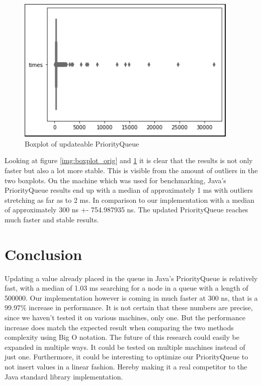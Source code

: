 \documentclass{article}
\begin{document}
\begin{figure}[H]
    \includegraphics[width=300pt]{boxplot_opt}
    \caption{Boxplot of updateable PriorityQueue}
    \label{img:boxplot_opt}
\end{figure}

Looking at figure \ref{img:boxplot_orig} and \ref{img:boxplot_opt} it is clear that the results is not only faster 
but also a lot more stable. This is visible from the amount of outliers in the two boxplots. 
On the machine which was used for benchmarking, Java's PriorityQueue results end up with a
median of approximately 1 ms with outliers stretching as far as to 2 ms. In comparison to 
our implementation with a median of approximately 300 ns +- 754.987935 ns. The updated 
PriorityQueue reaches much faster and stable results.  

\section{Conclusion} %
Updating a value already placed in the queue in Java's PriorityQueue is relatively
fast, with a median of 1.03 ms searching for a node in a queue with a length of 
500000. Our implementation however is coming in much faster at 300 ns, that is a 99.97\% 
increase in performance. It is not certain that these numbers are precise, since we haven't 
tested it on various machines, only one. But the performance increase does match the expected result 
when comparing the two methods complexity using Big O notation. 
The future of this research could easily be expanded in multiple ways.
It could be tested on multiple machines instead of just one. Furthermore, it could be interesting
to optimize our PriorityQueue to not insert values in a linear fashion. Hereby making it a 
real competitor to the Java standard library implementation.


\newpage



\end{document}
